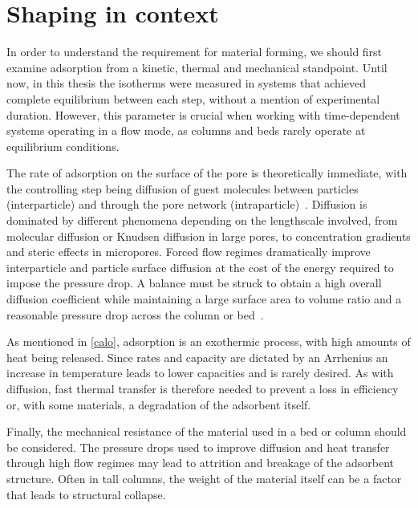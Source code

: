 
\section{Shaping in context}

In order to understand the requirement for material forming, 
we should first examine adsorption from 
a kinetic, thermal and mechanical standpoint. 
Until now, in this thesis the isotherms were measured in systems
that achieved complete equilibrium between each step, without 
a mention of experimental duration. However, this parameter is crucial
when working with time-dependent systems operating in a
flow mode, as columns and beds rarely operate at equilibrium
conditions.

The rate of adsorption on the surface of the pore is theoretically 
immediate, with the controlling step being diffusion of guest
molecules between particles (interparticle) and through the pore network 
(intraparticle)~\cite{ruthvenPressureSwingAdsorption1994}.
Diffusion is dominated by different phenomena depending on the
lengthscale involved, from molecular diffusion or Knudsen diffusion
in large pores, to concentration gradients and steric effects in
micropores. Forced flow regimes dramatically improve interparticle
and particle surface diffusion at the cost of the energy required
to impose the pressure drop. A balance must be struck to obtain a 
high overall diffusion coefficient while maintaining a large surface 
area to volume ratio and a reasonable pressure drop across the 
column or bed~\cite{mitchellAdvancedVisualizationStrategies2013}.

As mentioned in \autoref{calo}, adsorption is an exothermic process,
with high amounts of heat being released. Since rates and 
capacity are dictated by an Arrhenius an increase in temperature 
leads to lower capacities and is rarely desired. 
As with diffusion, fast thermal transfer is therefore needed
to prevent a loss in efficiency or, with some materials, a degradation
of the adsorbent itself.

Finally, the mechanical resistance of the material used in a 
bed or column should be considered. The pressure drops 
used to improve diffusion and heat transfer through high
flow regimes may lead to attrition and breakage of the 
adsorbent structure. Often in tall columns, the weight of the 
material itself can be a factor that leads to structural
collapse.

